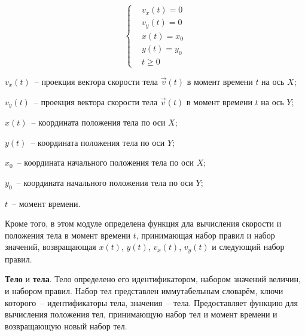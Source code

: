 \begin{equation}
\begin{cases}\label{rules0_0}
&v_x(t)  = 0   \\
&v_y(t)  = 0   \\
&x(t)    = x_0           \\
&y(t)    = y_0 \\
&t \geqslant 0 
\end{cases}
\end{equation}

\begin{Underequation}
    \(v_x(t)\)~-- проекция вектора скорости тела \(\vec{v}(t)\) в момент времени \(t\) на ось \(X\);

    \(v_y(t)\)~-- проекция вектора скорости тела \(\vec{v}(t)\) в момент времени \(t\) на ось \(Y\);

    \(x(t)\)~-- координата положения тела по оси \(X\);

    \(y(t)\)~-- координата положения тела по оси \(Y\);

    \(x_0\)~-- координата начального положения тела по оси \(X\);

    \(y_0\)~-- координата начального положения тела по оси \(Y\);

    \(t\)~-- момент времени.
\end{Underequation}

Кроме того, в этом модуле определена функция дла вычисления скорости и положения тела в момент времени \(t\),
принимающая набор правил и набор значений, возвращающая \(x(t)\), \(y(t)\), \(v_x(t)\), \(v_y(t)\) и следующий набор правил.

\textbf{Тело} и \textbf{тела}.\label{bodydescr}
Тело определено его идентификатором, набором значений величин, и набором правил. Набор тел
представлен иммутабельным словарём, ключи которого~-- идентификаторы тела, значения~-- тела.
Предоставляет функцию для вычисления положения тел, принимающую набор тел и момент времени
и возвращающую новый набор тел.


